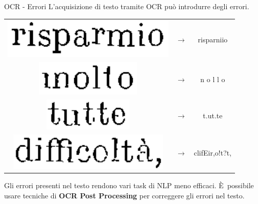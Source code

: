 \documentclass{beamer}
\newcommand{\E}{È}
\begin{document}
\begin{frame}{OCR - Errori}
	L'acquisizione di testo tramite OCR può introdurre degli errori.
	\begin{table}
	\begin{tabular}{ccc}
	\adjustbox{valign=c} {\includegraphics[height=.5cm]{images/slides/risparmio}} &
	$ \rightarrow $ & risparniio \\
	\adjustbox{valign=c} {\includegraphics[height=.5cm]{images/slides/molto}} &
	$ \rightarrow $ & n o l l o \\
	\adjustbox{valign=c} {\includegraphics[height=.5cm]{images/slides/tutte}} &
	$ \rightarrow $ & t.ut.te \\
	\adjustbox{valign=c} {\includegraphics[height=.5cm]{images/slides/difficolta}} &
	$ \rightarrow $ & clifEir,o!t?t, \\
	\end{tabular}
	\end{table}	
	
Gli errori presenti nel testo rendono vari task di NLP meno efficaci.
\newline \newline
\E\ possibile usare tecniche di \textbf{OCR Post Processing} per correggere gli errori nel testo.
	
	
\end{frame}
\end{document}
